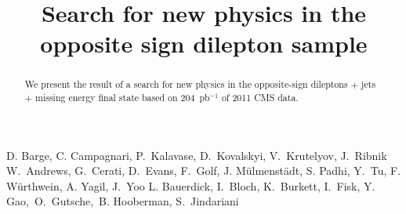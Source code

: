 \documentclass{cmspaper}
\newcommand{\lumi}{204~pb$^{-1}$}
\begin{document}
  

\begin{titlepage}
    \pagestyle {plain}

  \title {Search for new physics in the opposite sign dilepton sample}
\begin{Authlist}
D. Barge, C. Campagnari, P.~Kalavase, D.~Kovalskyi, V.~Krutelyov, J.~Ribnik
W.~Andrews, G.~Cerati, D.~Evans, F.~Golf, J. M\"ulmenst\"adt, S. Padhi, Y.~Tu, F. W\"urthwein, A. Yagil, J.~Yoo
L. Bauerdick, I.~Bloch, K.~Burkett, I.~Fisk, Y.~ Gao,~O.~Gutsche,~B. Hooberman, S.~Jindariani
\end{Authlist}
 

    \begin{abstract}
We present the result of a search for new physics in the opposite-sign 
dileptons $+$ jets $+$ missing energy final state based on \lumi
of 2011 CMS data.  

  \end{abstract}

\end{titlepage}
\newpage


\tableofcontents
\newpage
\linenumbers







%
%
%
%
%
%

\clearpage

\clearpage
\appendixtitleon
\appendixtitletocon
\begin{appendices}
\end{appendices}
\end{document}
